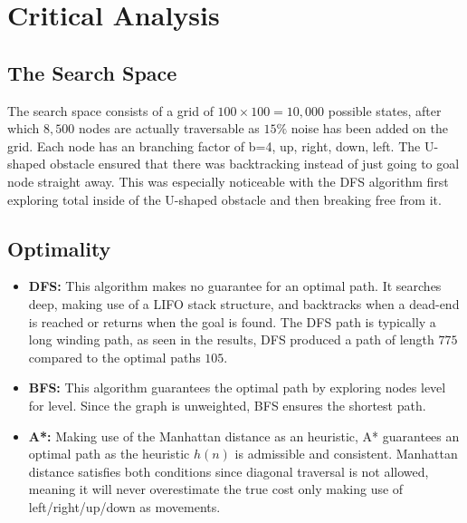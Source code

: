 \documentclass[12pt,a4paper]{article}
\begin{document}
\section{Critical Analysis}

\subsection{The Search Space}
The search space consists of a grid of $100 \times 100 = 10,000$ possible states,
after which $8,500$ nodes are actually traversable as $15\%$ noise has been added on the grid.
Each node has an branching factor of b=4, up, right, down, left.
The U-shaped obstacle ensured that there was backtracking instead of just going to goal node straight away.
This was especially noticeable with the DFS algorithm first exploring total inside of the U-shaped obstacle and then breaking free from it.


\subsection{Optimality}
\begin{itemize}
    \item \textbf{DFS:} This algorithm makes no guarantee for an optimal path. 
    It searches deep, making use of a LIFO stack structure, and backtracks when 
    a dead-end is reached or returns when the goal is found. The DFS path 
    is typically a long winding path, as seen in the results, DFS produced a 
    path of length $775$ compared to the optimal paths $105$.

    \item \textbf{BFS:} This algorithm guarantees the optimal path by exploring 
    nodes level for level. Since the graph is unweighted, BFS ensures the shortest path.

    \item \textbf{A*:} Making use of the Manhattan distance as an heuristic, A* 
    guarantees an optimal path as the heuristic $h(n)$ is admissible 
    and consistent. Manhattan distance satisfies both conditions since diagonal 
    traversal is not allowed, meaning it will never overestimate the true cost only making use of left/right/up/down as movements.
\end{itemize}
\end{document}
